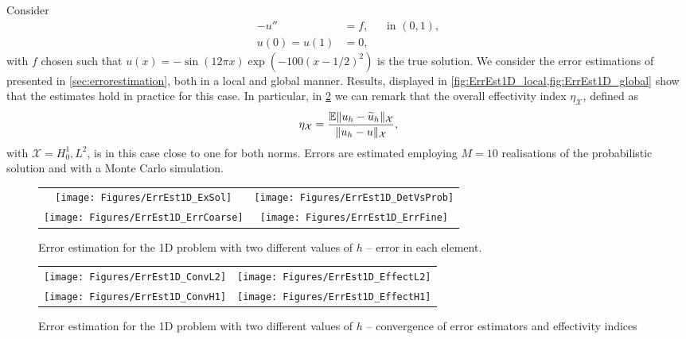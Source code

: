 \documentclass[10pt]{article}
\begin{document}
Consider
\begin{equation}
\begin{aligned}
	-u'' &= f, &&\text{in } (0,1), \\
	u(0) = u(1) &= 0,
\end{aligned}
\end{equation}
with $f$ chosen such that $u(x) = -\sin(12\pi x) \exp(-100(x-1/2)^2)$ is the true solution. We consider the error estimations of presented in \cref{sec:errorestimation}, both in a local and global manner. Results, displayed in \cref{fig:ErrEst1D_local,fig:ErrEst1D_global} show that the estimates hold in practice for this case. In particular, in \cref{fig:ErrEst1D_global} we can remark that the overall effectivity index $\eta_{\mathcal X}$, defined as
\begin{equation}
	\eta_{\mathcal X} = \frac{\operatorname{\mathbb{E}}\lVert u_h - \widetilde u_h\rVert_{\mathcal X}}{\lVert u_h - u\rVert_{\mathcal X}},
\end{equation}
with $\mathcal X = H_0^1, L^2$, is in this case close to one for both norms. Errors are estimated employing $M = 10$ realisations of the probabilistic solution and with a Monte Carlo simulation.

\begin{figure}[t]
	\centering
	\begin{tabular}{cc}
		\texttt{[image: Figures/ErrEst1D\_ExSol]} & \texttt{[image: Figures/ErrEst1D\_DetVsProb]} \\
		\texttt{[image: Figures/ErrEst1D\_ErrCoarse]} & \texttt{[image: Figures/ErrEst1D\_ErrFine]} \\
	\end{tabular}
	\caption{Error estimation for the 1D problem with two different values of $h$ -- error in each element.}
	\label{fig:ErrEst1D_local}
\end{figure}

\begin{figure}[t]
	\centering
	\begin{tabular}{cc}
		\texttt{[image: Figures/ErrEst1D\_ConvL2]} & \texttt{[image: Figures/ErrEst1D\_EffectL2]} \\
		\texttt{[image: Figures/ErrEst1D\_ConvH1]} & \texttt{[image: Figures/ErrEst1D\_EffectH1]} \\
	\end{tabular}
	\caption{Error estimation for the 1D problem with two different values of $h$ -- convergence of error estimators and effectivity indices}
	\label{fig:ErrEst1D_global}
\end{figure}
\end{document}

